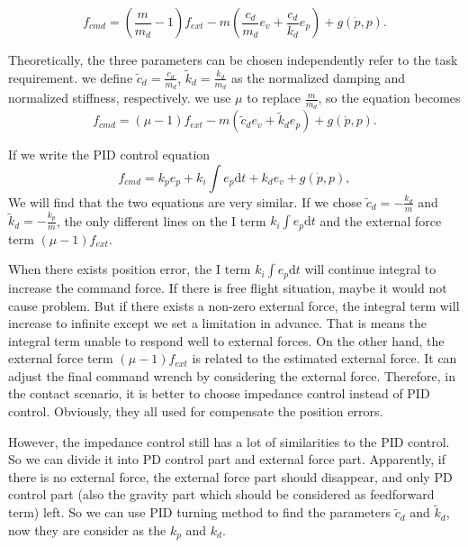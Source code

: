 \begin{equation}
\label{eq:imp cmd analysis3}
{{f}_{cmd}}=(\frac{m}{m_d}-1){{f}_{ext}}-m({\frac{c_d}{m_d}e_v+\frac{c_d}{k_d}e_p})+g(\dot{p}, p).
\end{equation}

Theoretically, the three parameters can be chosen independently refer to the task requirement. 
we define $\tilde{c}_d = \frac{c_d}{m_d}$, $\tilde{k}_d = \frac{k_d}{m_d}$ as the normalized damping and normalized stiffness, respectively. we use $\mu$ to replace $\frac{m}{m_d}$, so the equation becomes 
\begin{equation}
\label{eq:imp cmd analysis4}
{{f}_{cmd}}=(\mu-1){{f}_{ext}}-m({\tilde{c}_de_v+\tilde{k}_de_p})+g(\dot{p}, p).
\end{equation}

If we write the PID control equation 
\begin{equation}
\label{eq:PID cmd}
{{f}_{cmd}}=k_pe_p+k_i\int e_p\mathrm{d}t+k_de_v+g(\dot{p}, p),
\end{equation}
We will find that the two equations are very similar. If we chose $\tilde{c}_d=-\frac{k_d}{m}$ and $\tilde{k}_d=-\frac{k_p}{m}$, the only different lines on the I term $k_i\int e_p\mathrm{d}t$ and the external force term $(\mu-1){{f}_{ext}}$. 

When there exists position error, the I term $k_i\int e_p\mathrm{d}t$ will continue integral to increase the command force. If there is free flight situation, maybe it would not cause problem. But if there exists a non-zero external force, the integral term will increase to infinite except we set a limitation in advance. That is means the integral term unable to respond well to external forces. On the other hand, the external force term $(\mu-1){{f}_{ext}}$ is related to the estimated external force. It can adjust the final command wrench by considering the external force. Therefore, in the contact scenario, it is better to choose impedance control instead of PID control.
Obviously, they all used for compensate the position errors.

However, the impedance control still has a lot of similarities to the PID control. So we can divide it into PD control part and external force part. Apparently, if there is no external force, the external force part should disappear, and only PD control part (also the gravity part which should be considered as feedforward term) left. So we can use PID turning method to find the parameters $\tilde{c}_d$ and $\tilde{k}_d$, now they are consider as the $k_p$ and $k_d$.

